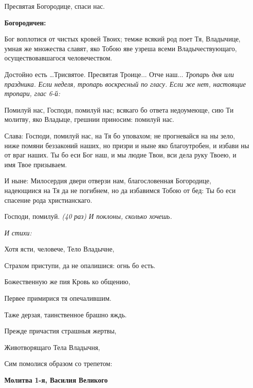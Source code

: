 Пресвятая Богородице, спаси нас.


\medskip
\bfseries Богородичен:\normalfont{}\nopagebreak

Бог воплотися от чистых кровей Твоих; темже всякий род поет Тя, Владычице, умная же множества славят, яко Тобою яве узреша всеми Владычествующаго, осуществовавшагося человечеством.

\medskip
Достойно есть …Трисвятое. Пресвятая Троице... Отче наш... \itshape Тропарь дня или праздника.\normalfont{} \itshape Если неделя, тропарь воскресный по гласу. Если же нет, настоящие тропари, глас 6-й:\normalfont{}


Помилуй нас, Господи, помилуй нас; всякаго бо ответа недоумеюще, сию Ти молитву, яко Владыце, грешнии приносим: помилуй нас.


Слава: Господи, помилуй нас, на Тя бо уповахом; не прогневайся на ны зело, ниже помяни беззаконий наших, но призри и ныне яко благоутробен, и избави ны от враг наших. Ты бо еси Бог наш, и мы людие Твои, вси дела руку Твоею, и имя Твое призываем.


И ныне: Милосердия двери отверзи нам, благословенная Богородице, надеющиися на Тя да не погибнем, но да избавимся Тобою от бед: Ты бо еси спасение рода христианскаго.


Господи, помилуй. \itshape (40 раз)\normalfont{} \itshape И поклоны, сколько хочешь.


\normalfont{}


\itshape И стихи:\normalfont{}


Хотя ясти, человече, Тело Владычне,


Страхом приступи, да не опалишися: огнь бо есть.


Божественную же пия Кровь ко общению,


Первее примирися тя опечалившим.


Таже дерзая, таинственное брашно яждь.


Прежде причастия страшныя жертвы,


Животворящаго Тела Владычня,


Сим помолися образом со трепетом:


\medskip
\bfseries Молитва 1-я, Василия Великого\normalfont{}\nopagebreak


